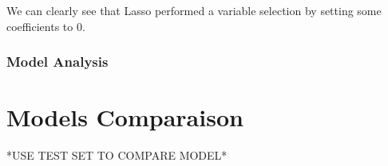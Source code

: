 \documentclass[]{report}
\begin{document}
We can clearly see that Lasso performed a variable selection by setting some coefficients to 0.

\subsubsection{Model Analysis}

\section{Models Comparaison}

*USE TEST SET TO COMPARE MODEL*
\end{document}
